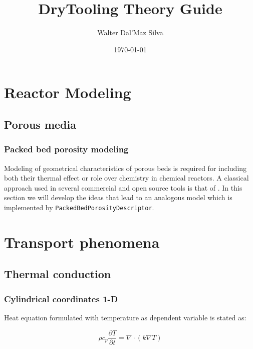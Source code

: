 \documentclass[oneside]{textbook}
\title{DryTooling Theory Guide}
\author{Walter Dal'Maz Silva}
\date{\today}
\begin{document}
\maketitle%

\tableofcontents%


\part{Reactor Modeling}

\chapter{\label{ch:porous-media}Porous media}%

\section{Packed bed porosity modeling}

Modeling of geometrical characteristics of porous beds is required for including both their thermal effect or role over chemistry in chemical reactors. A classical approach used in several commercial and open source tools is that of \textcite{Gunn1978}. In this section we will develop the ideas that lead to an analogous model which is implemented by \lstinline{PackedBedPorosityDescriptor}.

\part{Transport phenomena}

\chapter{\label{ch:thermal-conduction}Thermal conduction}%

\section{Cylindrical coordinates 1-D}

Heat equation formulated with temperature as dependent variable is stated as:

\begin{equation}
\rho{}c_{p}\frac{\partial{}T}{\partial{}t}=\nabla\cdotp{}(k\nabla{}T)
\end{equation}
\end{document}
